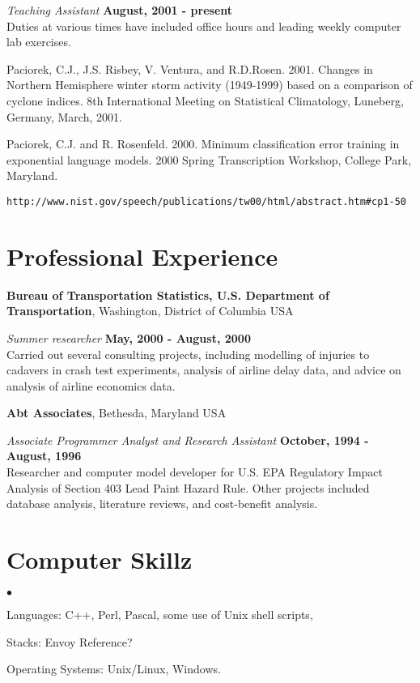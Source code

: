 \documentclass[margin,line]{res}
\newenvironment{list2}{
  \begin{list}{$\bullet$}{%
      \setlength{\itemsep}{0in}
      \setlength{\parsep}{0in} \setlength{\parskip}{0in}
      \setlength{\topsep}{0in} \setlength{\partopsep}{0in} 
      \setlength{\leftmargin}{0.2in}}}{\end{list}}
\begin{document}
\begin{resume}
{\em Teaching Assistant} \hfill {\bf August, 2001  - present}\\
Duties at various times have included 
office hours and leading weekly computer lab exercises.


Paciorek, C.J., J.S. Risbey, V. Ventura, and R.D.Rosen.  2001.  Changes in Northern Hemisphere winter storm activity (1949-1999) based
on a comparison of cyclone indices.  8th International Meeting on
Statistical Climatology, Luneberg, Germany, March, 2001.

Paciorek, C.J. and R. Rosenfeld.  2000.  Minimum classification error
training in exponential language models.  2000 Spring Transcription
Workshop, College Park, Maryland.
\vspace*{-.25in}  
\begin{verbatim}http://www.nist.gov/speech/publications/tw00/html/abstract.htm#cp1-50\end{verbatim}

\section{\sc Professional Experience}
{\bf Bureau of Transportation Statistics, U.S. Department of
  Transportation}, Washington, District of Columbia USA

\vspace{-.3cm}
{\em Summer researcher} \hfill {\bf May, 2000 - August, 2000}\\
Carried out several consulting projects, including modelling of
injuries to cadavers in crash test experiments, analysis of airline
delay data, and advice on analysis of airline economics data.

{\bf Abt Associates}, Bethesda, Maryland USA

\vspace{-.3cm}
{\em Associate Programmer Analyst and Research Assistant} \hfill {\bf
  October, 1994 - August, 1996}\\
Researcher and computer model developer for U.S. EPA Regulatory Impact
Analysis of Section 403 Lead Paint Hazard Rule.  Other projects
included database analysis, literature reviews, and cost-benefit analysis.

\section{\sc Computer Skillz} 
\begin{list2}
\item Languages:  C++, Perl, Pascal, some use of Unix shell scripts,
\item Stacks: Envoy Reference?
\item  
\item Operating Systems:  Unix/Linux, Windows.\\ 
\end{list2}


\end{resume}
\end{document}
